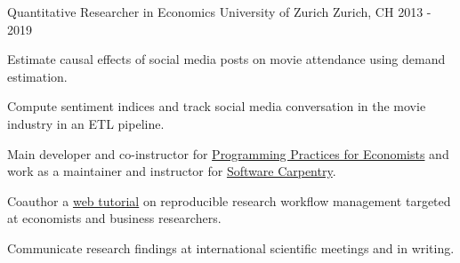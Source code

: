 \begin{section}[Experience]
    \entry%
  {Quantitative Researcher in Economics} %
  {University of Zurich} %
  {Zurich, CH} %
  {2013 - 2019} %
  {%
    \begin{entrylist}
      \item Estimate causal effects of social media posts on movie attendance using demand estimation. 
      \item Compute sentiment indices and track social media conversation in the movie industry in an ETL pipeline.
      \item Main developer and co-instructor for \href{https://pp4rs.github.io/}{ Programming Practices for Economists} and work as a maintainer and instructor for \href{https://uzhcrs.github.io/2019-02-07-zurich/}{ Software Carpentry}.
      \item Coauthor a \href{https://lachlandeer.github.io/teaching/swc-dc/}{ web tutorial} on reproducible research workflow management targeted at economists and business researchers.
      \item Communicate research findings at international scientific meetings and in writing.

    \end{entrylist}
  }%
  
\end{section}

